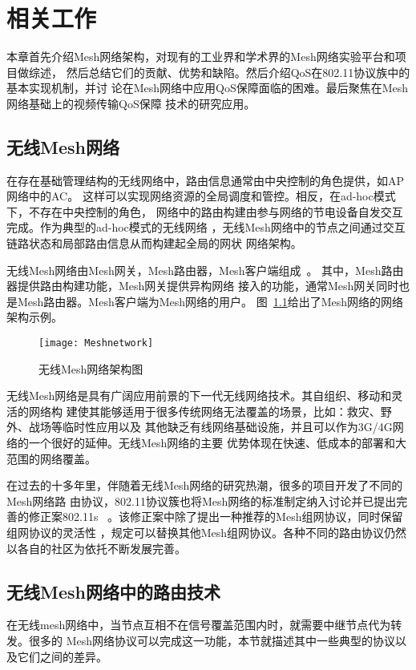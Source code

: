 \chapter{相关工作}
\label{cha:related_work}
本章首先介绍Mesh网络架构，对现有的工业界和学术界的Mesh网络实验平台和项目做综述，
然后总结它们的贡献、优势和缺陷。然后介绍QoS在802.11协议族中的基本实现机制，并讨
论在Mesh网络中应用QoS保障面临的困难。最后聚焦在Mesh网络基础上的视频传输QoS保障
技术的研究应用。

\section{无线Mesh网络}
在存在基础管理结构的无线网络中，路由信息通常由中央控制的角色提供，如AP网络中的AC。
这样可以实现网络资源的全局调度和管控。相反，在ad-hoc模式下，不存在中央控制的角色，
网络中的路由构建由参与网络的节电设备自发交互完成。作为典型的ad-hoc模式的无线网络
，无线Mesh网络中的节点之间通过交互链路状态和局部路由信息从而构建起全局的网状
网络架构。

无线Mesh网络由Mesh网关，Mesh路由器，Mesh客户端组成~\cite{meshsurvey}。
其中，Mesh路由器提供路由构建功能，Mesh网关提供异构网络
接入的功能，通常Mesh网关同时也是Mesh路由器。Mesh客户端为Mesh网络的用户。
图~\ref{fig:meshnetwork}给出了Mesh网络的网络架构示例。
\begin{figure}[H] %
  \centering
  \texttt{[image: Meshnetwork]}
  \caption{无线Mesh网络架构图}
  \label{fig:meshnetwork}
\end{figure}

无线Mesh网络是具有广阔应用前景的下一代无线网络技术。其自组织、移动和灵活的网络构
建使其能够适用于很多传统网络无法覆盖的场景，比如：救灾、野外、战场等临时性应用以及
其他缺乏有线网络基础设施，并且可以作为3G/4G网络的一个很好的延伸。无线Mesh网络的主要
优势体现在快速、低成本的部署和大范围的网络覆盖。

在过去的十多年里，伴随着无线Mesh网络的研究热潮，很多的项目开发了不同的Mesh网络路
由协议，802.11协议簇也将Mesh网络的标准制定纳入讨论并已提出完善的修正案802.11s
~\cite{IEEE80211s}。该修正案中除了提出一种推荐的Mesh组网协议，同时保留组网协议的灵活性
，规定可以替换其他Mesh组网协议。各种不同的路由协议仍然以各自的社区为依托不断发展完善。

\section{无线Mesh网络中的路由技术}
在无线mesh网络中，当节点互相不在信号覆盖范围内时，就需要中继节点代为转发。很多的
Mesh网络协议可以完成这一功能，本节就描述其中一些典型的协议以及它们之间的差异。

